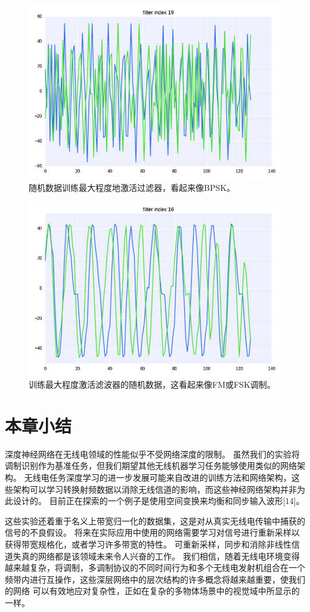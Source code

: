 \begin{figure}[!h]
	\centering
	\includegraphics[scale=1]{figures/chapter_5/fig9_b}
	\caption{随机数据训练最大程度地激活过滤器，看起来像BPSK。}
\end{figure}

\begin{figure}[!h]
	\centering
	\includegraphics[scale=1]{figures/chapter_5/fig10_b}
	\caption{训练最大程度激活滤波器的随机数据，这看起来像FM或FSK调制。}
\end{figure}


\section{本章小结}
深度神经网络在无线电领域的性能似乎不受网络深度的限制。 虽然我们的实验将调制识别作为基准任务，但我们期望其他无线机器学习任务能够使用类似的网络架构。 无线电任务深度学习的进一步发展可能来自改进的训练方法和网络架构，这些架构可以学习转换射频数据以消除无线信道的影响，而这些神经网络架构并非为此设计的。 目前正在探索的一个例子是使用空间变换来均衡和同步输入波形[14]。\par

这些实验还着重于名义上带宽归一化的数据集，这是对从真实无线电传输中捕获的信号的不良假设。 将来在实际应用中使用的网络需要学习对信号进行重新采样以获得带宽规格化，或者学习许多带宽的特性。 可重新采样，同步和消除非线性信道失真的网络都是该领域未来令人兴奋的工作。 我们相信，随着无线电环境变得越来越复杂，将调制，多调制协议的不同时间行为和多个无线电发射机组合在一个频带内进行互操作，这些深层网络中的层次结构的许多概念将越来越重要，使我们的网络 可以有效地应对复杂性，正如在复杂的多物体场景中的视觉域中所显示的一样。\par